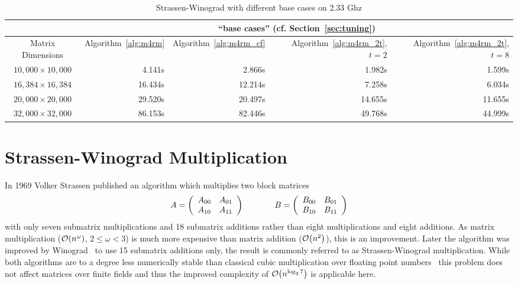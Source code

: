 \begin{table}[htbp]
\begin{footnotesize}
\begin{center}
\begin{tabular}{|c|r|r|r|r|}
\hline
 & \multicolumn{4}{c|}{``base cases'' (cf. Section~\ref{sec:tuning})}\\
\hline
Matrix Dimensions & 
Algorithm~\ref{alg:m4rm} &
Algorithm~\ref{alg:m4rm_cf} & 
Algorithm~\ref{alg:m4rm_2t}, $t=2$ &
Algorithm~\ref{alg:m4rm_2t}, $t=8$ \\
\hline
$10,000\times10,000$ &  4.141s &  2.866s &  1.982s &  1.599s\\
$16,384\times16,384$ & 16.434s & 12.214s &  7.258s &  6.034s\\ 
$20,000\times20,000$ & 29.520s & 20.497s & 14.655s & 11.655s\\
$32,000\times32,000$ & 86.153s & 82.446s & 49.768s & 44.999s\\
\hline
\end{tabular}
\caption{Strassen-Winograd with different base cases on 2.33 Ghz \CTD}
\label{tab:m4rm-techniques-c2d}
\end{center}
\end{footnotesize}
\end{table}


\section{Strassen-Winograd Multiplication}
\label{sec:strassen}
In 1969 Volker Strassen \cite{strassen} published an algorithm which multiplies two block matrices 
\[
 A = \left(\begin{array}{cc}
           A_{00} & A_{01}\\
           A_{10} & A_{11}\\
           \end{array}\right)\hspace{13mm}
 B = \left(\begin{array}{cc}
           B_{00} & B_{01}\\
           B_{10} & B_{11}\\
           \end{array}\right)
\]
with only seven submatrix multiplications and 18 submatrix additions rather than eight multiplications and eight additions. As matrix multiplication
($\mathcal{O}\!\left(n^\omega\right)$, $2 \leq \omega < 3$) is much more expensive than matrix addition ($\mathcal{O}\!\left(n^2\right)$), this is an improvement. Later the algorithm was improved by Winograd~\cite{winograd} to use 15 submatrix additions only, the result is commonly referred to as Strassen-Winograd multiplication. While both algorithms are to a degree less numerically stable than classical cubic multiplication over floating point numbers~\cite[Ch. 26.3.2]{Higham} this problem does not affect matrices over finite fields and thus the improved complexity of $\mathcal{O}\!\left(n^{\log_2 7}\right)$ \cite{strassen,bard-phd} is applicable here.

